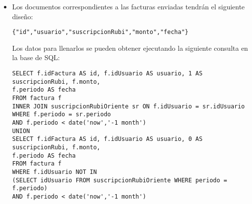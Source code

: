\begin{itemize}
\item Los documentos correspondientes a las facturas enviadas tendr\'an el siguiente dise\~no:
\begin{verbatim}
{"id","usuario","suscripcionRubi","monto","fecha"}
\end{verbatim}
Los datos para llenarlos se pueden obtener ejecutando la siguiente consulta en la base de SQL:
\begin{verbatim}
SELECT f.idFactura AS id, f.idUsuario AS usuario, 1 AS suscripcionRubi, f.monto, 
f.periodo AS fecha
FROM factura f 
INNER JOIN suscripcionRubiOriente sr ON f.idUsuario = sr.idUsuario
WHERE f.periodo = sr.periodo 
AND f.periodo < date('now','-1 month')
UNION 
SELECT f.idFactura AS id, f.idUsuario AS usuario, 0 AS suscripcionRubi, f.monto, 
f.periodo AS fecha
FROM factura f
WHERE f.idUsuario NOT IN 
(SELECT idUsuario FROM suscripcionRubiOriente WHERE periodo = f.periodo)
AND f.periodo < date('now','-1 month')
\end{verbatim}


\end{itemize}
